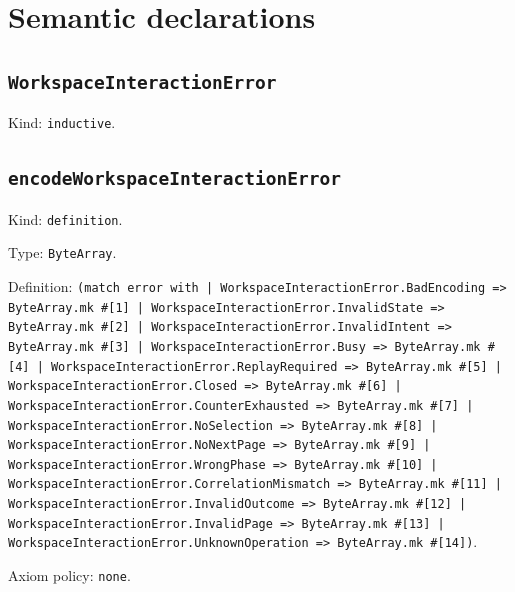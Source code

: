 \documentclass[11pt]{article}
\begin{document}
\section*{Semantic declarations}
\subsection*{\texttt{WorkspaceInteractionError}}
\noindent Kind: \texttt{inductive}.\par
\subsection*{\texttt{encodeWorkspaceInteractionError}}
\noindent Kind: \texttt{definition}.\par
\noindent Type: \texttt{ByteArray}.\par
\noindent Definition: \texttt{(match error with | WorkspaceInteractionError.BadEncoding => ByteArray.mk \#[1] | WorkspaceInteractionError.InvalidState => ByteArray.mk \#[2] | WorkspaceInteractionError.InvalidIntent => ByteArray.mk \#[3] | WorkspaceInteractionError.Busy => ByteArray.mk \#[4] | WorkspaceInteractionError.ReplayRequired => ByteArray.mk \#[5] | WorkspaceInteractionError.Closed => ByteArray.mk \#[6] | WorkspaceInteractionError.CounterExhausted => ByteArray.mk \#[7] | WorkspaceInteractionError.NoSelection => ByteArray.mk \#[8] | WorkspaceInteractionError.NoNextPage => ByteArray.mk \#[9] | WorkspaceInteractionError.WrongPhase => ByteArray.mk \#[10] | WorkspaceInteractionError.CorrelationMismatch => ByteArray.mk \#[11] | WorkspaceInteractionError.InvalidOutcome => ByteArray.mk \#[12] | WorkspaceInteractionError.InvalidPage => ByteArray.mk \#[13] | WorkspaceInteractionError.UnknownOperation => ByteArray.mk \#[14])}.\par
\noindent Axiom policy: \texttt{none}.\par
\end{document}

